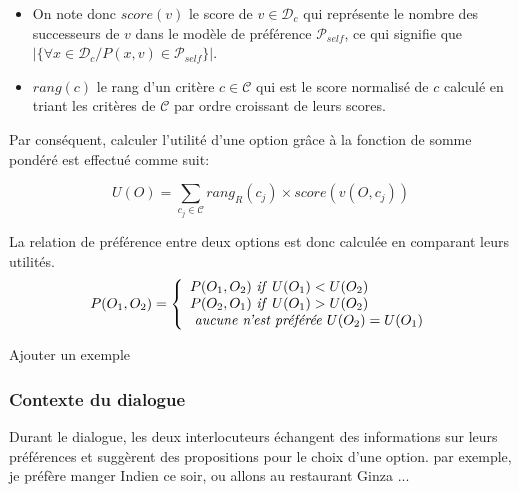\documentclass [french]{sig-alternate-05-2015}
\begin{document}
 \begin{itemize}
 	\item On note donc $score(v)$ le score de $v \in \mathcal{D}_{c}$ qui représente le nombre des successeurs de  $v$  dans le modèle de préférence $\mathcal{P}_{self}$, ce qui signifie que $|\{ \forall x \in \mathcal{D}_{c} / P (x,v) \in \mathcal{P}_{self}\}|$.
 	\item $rang(c)$ le rang d'un critère $c \in \mathcal{C}$ qui est le score normalisé de $c$ calculé en triant les critères de $\mathcal{C}$ par ordre croissant de leurs scores.
 \end{itemize}
Par conséquent, calculer l'utilité d'une option grâce à la fonction de somme pondéré est effectué comme suit:

\[U(O) = \sum_{c_j \in \mathcal{C}}  rang_R(c_j) \times score\left( v(O, c_j) \right) \] 


\par La relation de préférence entre deux options est donc calculée en comparant leurs utilités. 
\[ P(O_1, O_2)  = \left \{
\begin{array}{l}
P(O_1, O_2)$ \textit{if}  $U(O_1) < U(O_2) \\
P(O_2, O_1)$  \textit{if} $U(O_1) > U(O_2)  \\
$  \textit{aucune n'est préférée}  $U(O_2) = U(O_1)\\
\end{array}
\right .\]

{\color{red}
Ajouter un exemple }
\subsubsection{Contexte du dialogue}
\par Durant le dialogue, les deux interlocuteurs échangent des informations sur leurs préférences et suggèrent des propositions pour le choix d'une option. par exemple, je préfère manger Indien ce soir, ou allons au restaurant Ginza ...
\end{document}
